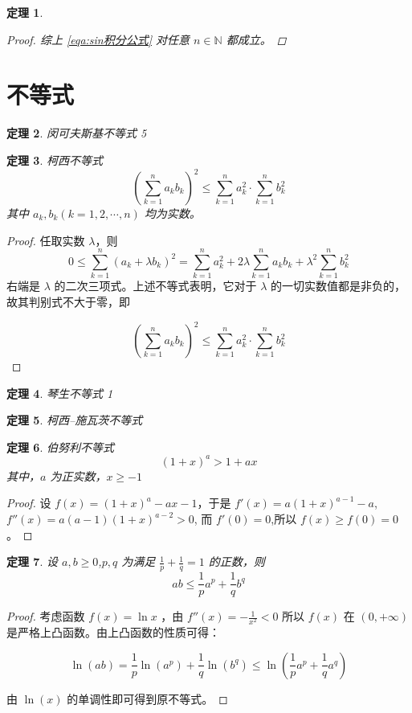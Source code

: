 \documentclass{ctexart}
\numberwithin{equation}{section}    %
\newtheorem{theorem}{定理}
\begin{document}
\begin{theorem}
\begin{proof}
综上 \eqref{eqa:sin积分公式} 对任意 $n\in\mathbb{N}$ 都成立。
\end{proof}
\end{theorem}
\section{不等式}
\begin{theorem}{闵可夫斯基不等式}
    5
\end{theorem}
\begin{theorem}{柯西不等式}
\begin{equation}
    \left(\sum_{k=1}^na_kb_k\right)^2\leqslant\sum_{k=1}^na_k^2\cdot\sum_{k=1}^nb_k^2
\end{equation}
其中 $a_k,b_k(k=1,2,\cdots,n)$ 均为实数。
\end{theorem}
\begin{proof}
    任取实数 $\lambda$，则
\begin{equation}
    0\leqslant\sum_{k=1}^n(a_k+\lambda b_k)^2=\sum_{k=1}^na_k^2+2\lambda\sum_{k=1}^na_kb_k+\lambda^2\sum_{k=1}^nb_k^2
\end{equation}
右端是 $\lambda$ 的二次三项式。上述不等式表明，它对于 $\lambda$ 的一切实数值都是非负的，故其判别式不大于零，即

\begin{equation}
    \left(\sum_{k=1}^na_kb_k\right)^2\leqslant\sum_{k=1}^na_k^2\cdot\sum_{k=1}^nb_k^2
\end{equation}
\end{proof}
\begin{theorem}{琴生不等式}
    1
\end{theorem}
\begin{theorem}{柯西–施瓦茨不等式}
    
\end{theorem}
\begin{theorem}{伯努利不等式}
   \begin{equation}
    (1+x)^{a}> 1+ax
   \end{equation}
其中，$a$ 为正实数，$x\geqslant-1$
\end{theorem}
\begin{proof}
    设 $f(x)=(1+x)^a-ax-1$，于是 $f'(x)=a(1+x)^{a-1}-a$,$f''(x)=a(a-1)(1+x)^{a-2}>0$, 而 $f'(0)=0$,所以 $f(x)\geqslant f(0)=0$。
\end{proof}
\begin{theorem}
    设 $a,b\geqslant 0 $,$p,q$ 为满足 $\frac{1}{p}+\frac{1}{q}=1$ 的正数，则
    \begin{equation}
        ab\leqslant\frac{1}{p}a^p+\frac{1}{q}b^q
    \end{equation}
\end{theorem}
\begin{proof}
    考虑函数 $f(x)=\ln x$ ，由 $f''(x)=-\frac{1}{x^2}<0$ 所以 $f(x)$ 在 $(0,+\infty)$ 是严格上凸函数。由上凸函数的性质可得：
    
    \begin{equation}
    \ln(ab)=\frac{1}{p}\ln(a^p)+\frac{1}{q}\ln(b^q)\leqslant\ln(\frac{1}{p}a^p+\frac{1}{q}a^q)
    \end{equation}

    由 $\ln(x)$ 的单调性即可得到原不等式。
    
\end{proof}
\end{document}
